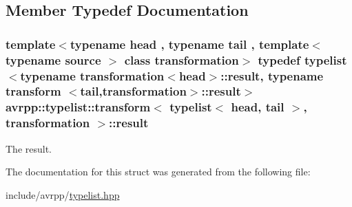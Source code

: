 \subsection{Member Typedef Documentation}
\hypertarget{structavrpp_1_1typelist_1_1transform_3_01typelist_3_01head_00_01tail_01_4_00_01transformation_01_4_a86e942ad3ce6ca72fd798110269a71f7}{
\subsubsection[{result}]{\setlength{\rightskip}{0pt plus 5cm}template$<$typename head , typename tail , template$<$ typename source $>$ class transformation$>$ typedef {\bf typelist}$<$typename transformation$<$head$>$::{\bf result}, typename transform $<$tail,transformation$>$::{\bf result}$>$ avrpp::typelist::transform$<$ {\bf typelist}$<$ head, tail $>$, transformation $>$::{\bf result}}}
\label{structavrpp_1_1typelist_1_1transform_3_01typelist_3_01head_00_01tail_01_4_00_01transformation_01_4_a86e942ad3ce6ca72fd798110269a71f7}


The result. 



The documentation for this struct was generated from the following file:\begin{DoxyCompactItemize}
\item 
include/avrpp/\hyperlink{typelist_8hpp}{typelist.hpp}\end{DoxyCompactItemize}
